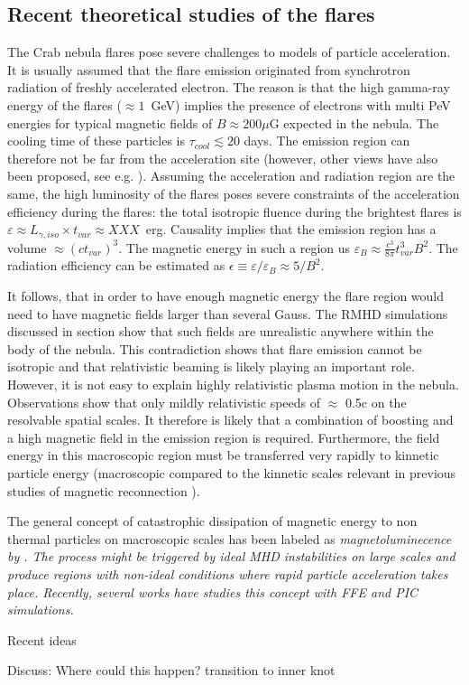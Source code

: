 \subsection{Recent theoretical studies of the flares}

The Crab nebula flares pose severe challenges to models of particle acceleration. It is usually assumed that the flare emission originated from synchrotron radiation of freshly accelerated electron. The reason is that the high gamma-ray energy of the flares ($\approx 1$~GeV) implies the presence of electrons with multi PeV energies for typical magnetic fields of $B \approx 200 \mu$G expected in the nebula. The cooling time of these particles is $\tau_{cool} \lesssim 20$ days. The emission region can therefore not be far from the acceleration site (however, other views have also been proposed, see e.g. \citet{Bykov_2012,2015arXiv151205426Z}). Assuming the acceleration and radiation region are the same, the high luminosity of the flares poses severe constraints of the acceleration efficiency during the flares: the total isotropic fluence during the brightest flares is $\varepsilon \approx L_{\gamma,iso} \times t_{var} \approx XXX $~erg. Causality implies that the emission region has a volume $\approx (c t_{var})^3$. The magnetic energy in such a region us $\varepsilon_B \approx \frac{c^3}{8 \pi} t_{var}^3 B^2$. The radiation efficiency can be estimated as $\epsilon \equiv \varepsilon / \varepsilon_B \approx  5 / B^2$. 

It follows, that in order to have enough magnetic energy the flare region would need to have magnetic fields larger than several Gauss. The RMHD simulations discussed in section show that such fields are unrealistic anywhere within the body of the nebula.  This contradiction shows that flare emission cannot be isotropic and that relativistic beaming is likely playing an important role. However, it is not easy to explain highly relativistic plasma motion in the nebula. Observations show that only mildly relativistic speeds of $\approx$ 0.5c on the resolvable spatial scales. It therefore is likely that a combination of boosting and a high magnetic field in the emission region is required. Furthermore, the field energy in this macroscopic region must be transferred very rapidly to kinnetic particle energy (macroscopic compared to the kinnetic scales relevant in previous studies of magnetic reconnection \citep{Cerutti_2014}). 

The general concept of catastrophic dissipation of magnetic energy to non thermal particles on macroscopic scales has been labeled as \it{magnetoluminecence} by . The process might be  triggered by ideal MHD instabilities on large scales and produce regions with non-ideal conditions where rapid particle acceleration takes place. Recently, several works have studies this concept with FFE and PIC simulations. 


Recent ideas  \cite{2016arXiv160403179Y}\cite{2016arXiv160304850N}\cite{2016arXiv160305731L}

Discuss: Where could this happen? transition to inner knot